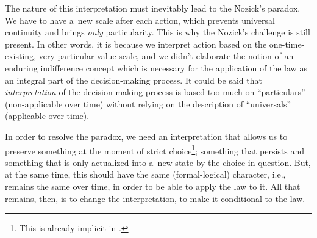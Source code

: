 The nature of this interpretation must inevitably lead to the Nozick's paradox. We have to have a~new scale after each action, which prevents universal continuity and brings \textit{only} particularity. This is why the Nozick's challenge is still present. In other words, it is because we interpret action based on the one-time-existing, very particular value scale, and we didn't elaborate the notion of an enduring indifference concept which is necessary for the application of the law as an integral part of the decision-making process. It could be said that \textit{interpretation} of the decision-making process is based too much on ``particulars'' (non-applicable over time) without relying on the description of ``universals'' (applicable over time).



In order to resolve the paradox, we need an interpretation that allows us to preserve something at the moment of strict choice\footnote{This is already implicit in 
\parencites[][]{}[][]{}.%
}; something that persists and something that is only actualized into a~new state by the choice in question. But, at the same time, this should have the same (formal-logical) character, i.e., remains the same over time, in order to be able to apply the law to it. All that remains, then, is to change the interpretation, to make it conditional to the law.



